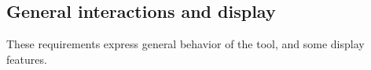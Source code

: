 
\subsection{General interactions and display}

These requirements express general behavior of the tool, and some display features.

